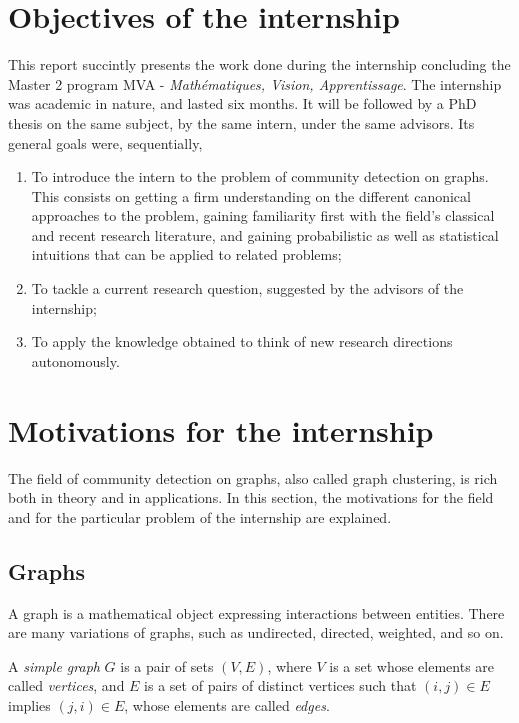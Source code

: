 \documentclass[../../main.tex]{subfiles} %
\begin{document}
\section{Objectives of the internship}
This report succintly presents the work done during the internship 
concluding the Master 2 program MVA - \textit{Mathématiques, Vision, 
Apprentissage}. The internship was academic in nature, and lasted six months. 
It will be followed by a PhD thesis on the same subject, by the same intern, 
under the same advisors. Its general goals were, sequentially,
\begin{enumerate}[label=\raisenth*]
	\item To introduce the intern to the problem of community detection on 
	graphs. This consists on getting a firm understanding on the different 
	canonical approaches to the problem, gaining familiarity first with the 
	field's classical and recent research literature, and gaining probabilistic 
	as well as statistical intuitions that can be applied to related problems;
	\item To tackle a current research question, suggested by the advisors of 
	the internship;
	\item To apply the knowledge obtained to think of new research 
	directions autonomously.
\end{enumerate}

\section{Motivations for the internship}
The field of community detection on graphs, also called graph clustering, is rich 
both in theory and in applications. In this section, the motivations for the field 
and for the particular problem of the internship are explained.

\subsection{Graphs}
A graph is a mathematical object expressing interactions between entities. 
There are many variations of graphs, such as undirected, directed, weighted, 
and so on.
\begin{definition}
	A \textit{simple graph} \(G\) is a pair of sets \((V, E)\), where \(V\) is a set 
	whose elements are called \textit{vertices}, and \(E\) is a set of pairs of 
	distinct vertices such that \((i, j) \in E\) implies \((j, i) \in E\), whose 
	elements 
	are called \textit{edges}.
\end{definition}
\end{document}
